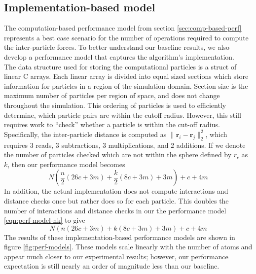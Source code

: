 \documentclass[12pt]{article}
\begin{document}

\subsection{Implementation-based model}
The computation-based performance model from section
\ref{sec:comp-based-perf} represents a best case scenario for the
number of operations required to compute the inter-particle forces.
To better understand our baseline results, we also develop a
performance model that captures the algorithm's implementation.
\\

The data structure used for storing the computational particles is a
struct of linear C arrays. Each linear array is divided into equal
sized sections which store information for particles in a region of
the simulation domain.  Section size is the maximum number of
particles per region of space, and does not change throughout the
simulation.  This ordering of particles is used to efficiently
determine, which particle pairs are within the cutoff radius.
However, this still requires work to ``check'' whether a particle is
within the cut-off radius. Specifically, the inter-particle distance
is computed as $\| \bm{r}_i - \bm{r}_j\|_2^2$, which requires 3 reads,
3 subtractions, 3 multiplications, and 2 additions.  If we denote the
number of particles checked which are not within the sphere defined by
$r_c$ as $k$, then our performance model becomes
\begin{equation}
  N \left(\frac{n}{2} \left(26 c + 3 m\right)+\frac{k}{2} \left(8 c + 3 m\right) + 3 m\right) + c + 4 m
  \label{eqn:perf-model-nk}
\end{equation}
In addition, the actual implementation does not compute interactions
and distance checks once but rather does so for each particle. This
doubles the number of interactions and distance checks in our the
performance model \ref{eqn:perf-model-nk} to give
\begin{equation}
  N \left(n \left(26 c + 3 m\right)+k \left(8 c + 3 m\right) + 3 m\right) + c + 4 m
  \label{eqn:perf-model-2n2k}
\end{equation}
The results of these implementation-based performance models are shown
in figure \ref{fig:perf-models}. These models scale linearly with the
number of atoms and appear much closer to our experimental results;
however, our performance expectation is still nearly an order of
magnitude less than our baseline.
\end{document}
